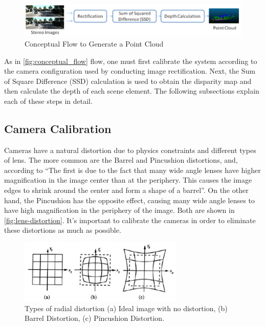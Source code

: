         \begin{figure}[H]
     \caption{\label{fig:conceptual_flow}
Conceptual Flow to Generate a Point Cloud}
     \begin{center}
        \includegraphics[width=1\textwidth]{images/conceitual_flow.png}
     \end{center}
    \end{figure}
    
    As in \autoref{fig:conceptual_flow} flow, one must first calibrate the system according to the camera configuration used by conducting image rectification. Next, the Sum of Square Difference (SSD) calculation is used to obtain the disparity map and then calculate the depth of each scene element. The following subsections explain each of these steps in detail.
    
\subsection{Camera Calibration}

    Cameras have a natural distortion due to physics constraints and different types of lens. The more common are the Barrel and Pincushion distortions, and, according to \cite[p.1]{Vass2003ApplyingAR} “The first is due to the fact that many wide angle lenses have higher magnification in the image center than at the periphery. This causes the image edges to shrink around the center and form a shape of a barrel”. On the other hand, the Pincushion has the opposite effect, causing many wide angle lenses to have high magnification in the periphery of the image. Both are shown in \autoref{fig:lens-distortion}. It’s important to calibrate the cameras in order to eliminate these distortions as much as possible. 
    
    \begin{figure}[H]
     \caption{\label{fig:lens-distortion}
Types of radial distortion (a) Ideal image with no distortion, (b) Barrel Distortion, (c) Pincushion Distortion.}
     \begin{center}
        \includegraphics[width=0.7\textwidth]{images/lens.png}
     \end{center}
    \end{figure}    
    
